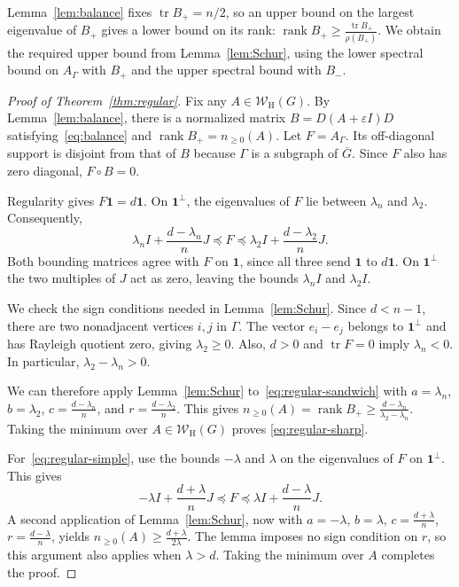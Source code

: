 \documentclass[11pt]{article}
\numberwithin{equation}{section}
\theoremstyle{definition}
\theoremstyle{remark}
\DeclareMathOperator{\tr}{tr}
\DeclareMathOperator{\rank}{rank}
\newcommand{\one}{\mathbf 1}
\newcommand{\W}{\mathcal W_{\mathrm H}}
\begin{document}
Lemma~\ref{lem:balance} fixes $\tr B_+=n/2$, so an upper bound
on the largest eigenvalue of $B_+$ gives a lower bound on its rank:
$\rank B_+\geq\frac{\tr B_+}{\rho(B_+)}$.
We obtain the required upper bound from Lemma~\ref{lem:Schur},
using the lower spectral bound on $A_\Gamma$ with $B_+$ and
the upper spectral bound with $B_-$.

\begin{proof}[Proof of Theorem~\ref{thm:regular}]
Fix any $A\in\W(G)$.
By Lemma~\ref{lem:balance}, there is a normalized matrix
$B=D(A+\varepsilon I)D$
satisfying~\eqref{eq:balance} and
$\rank B_+=n_{\geq0}(A)$.
Let $F=A_\Gamma$. Its off-diagonal support is disjoint from that
of $B$ because $\Gamma$ is a subgraph of $\overline G$.
Since $F$ also has zero diagonal, $F\circ B=0$.

Regularity gives $F\one=d\one$.
On $\one^\perp$, the eigenvalues of $F$ lie between
$\lambda_n$ and $\lambda_2$. Consequently,
\begin{equation}\label{eq:regular-sandwich}
 \lambda_n I+\frac{d-\lambda_n}{n}J
 \preceq F\preceq
 \lambda_2 I+\frac{d-\lambda_2}{n}J.
\end{equation}
Both bounding matrices agree with $F$ on $\one$, since all three
send $\one$ to $d\one$. On $\one^\perp$ the two multiples of $J$
act as zero, leaving the bounds $\lambda_n I$ and $\lambda_2 I$.

We check the sign conditions needed in Lemma~\ref{lem:Schur}.
Since $d<n-1$, there are two nonadjacent vertices $i,j$ in
$\Gamma$. The vector $e_i-e_j$ belongs to $\one^\perp$
and has Rayleigh quotient zero, giving $\lambda_2\geq0$.
Also, $d>0$ and $\tr F=0$ imply $\lambda_n<0$.
In particular, $\lambda_2-\lambda_n>0$.

We can therefore apply Lemma~\ref{lem:Schur}
to~\eqref{eq:regular-sandwich} with $a=\lambda_n$, $b=\lambda_2$,
$c=\frac{d-\lambda_n}{n}$, and $r=\frac{d-\lambda_2}{n}$. This gives
$n_{\geq0}(A)=\rank B_+ \geq\frac{d-\lambda_n}{\lambda_2-\lambda_n}$.
Taking the minimum over $A\in\W(G)$ proves
\eqref{eq:regular-sharp}.

For~\eqref{eq:regular-simple}, use the bounds $-\lambda$ and
$\lambda$ on the eigenvalues of $F$ on $\one^\perp$. This gives
\[
 -\lambda I+\frac{d+\lambda}{n}J
 \preceq F\preceq
 \lambda I+\frac{d-\lambda}{n}J.
\]
A second application of Lemma~\ref{lem:Schur}, now with
$a=-\lambda$, $b=\lambda$, $c=\frac{d+\lambda}{n}$, $r=\frac{d-\lambda}{n}$,
yields
$n_{\geq0}(A)\geq\frac{d+\lambda}{2\lambda}$.
The lemma imposes no sign condition on $r$, so this argument
also applies when $\lambda>d$.
Taking the minimum over $A$ completes the proof.
\end{proof}
\end{document}
